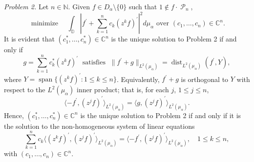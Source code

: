 \documentclass[11 pt,reqno]{amsart}
\theoremstyle{definition}
\theoremstyle{remark}
\numberwithin{equation}{section} \numberwithin{figure}{section}
\newcommand{\CC}{{\mathbb C}}
\newcommand{\DD}{{\mathbb D}}
\newcommand{\NN}{{\mathbb N}}
\DeclareMathOperator{\Pol}{{\mathcal P}}
\DeclareMathOperator{\dist}{dist}
\DeclareMathOperator{\Span}{span}
\begin{document}
\emph{Problem 2.}  Let $n\in\NN$.  Given $f\in D_{\alpha}\setminus\{0\}$ such that
$1\notin f\cdot\Pol_{n}$,
\[  \text{ minimize }\quad
        \int_{\DD}\left|f^{\prime}+\sum_{k=1}^{n}c_{k}(z^{k}f)^{\prime}\right|^{2}
        d\mu_{\alpha}\text{ over }(c_1,\ldots,c_{n})\in\CC^{n}. \]
It is evident that $(c_1^{*},\ldots,c_n^{*})\in\CC^{n}$ is the unique solution to
Problem 2 if and only if
\[  g=\sum_{k=1}^{n}c_{k}^{*}(z^{k}f)^{\prime}\;\text{ satisfies }\;
        \|f^{\prime}+g\|_{L^{2}(\mu_{\alpha})}=\dist_{L^{2}(\mu_{\alpha})}(f^{\prime},Y),   \]
where $Y=\Span\{(z^{k} f)^{\prime}: 1\leq k\leq n\}$. Equivalently, $f^{\prime}+g$ is
orthogonal to $Y$ with respect to the $L^{2}(\mu_{\alpha})$ inner product; that is,
for each $j$, $1\leq j\leq n$,
\[  \langle -f^{\prime}, (z^{j} f)^{\prime}\rangle_{L^{2}(\mu_{\alpha})}
        =\langle g, (z^{j} f)^{\prime}\rangle_{L^{2}(\mu_{\alpha})}.    \]
Hence, $(c_1^{*},\ldots,c_n^{*})\in\CC^{n}$ is the unique solution to Problem 2 if and
only if it is the solution to the non-homogeneous system of linear equations
\begin{equation}\label{keySystem}
            \sum_{k=1}^{n}c_{k}
            \langle (z^{k} f)^{\prime},(z^{j}f)^{\prime}\rangle_{L^{2}(\mu_{\alpha})}
            =\langle -f^{\prime}, (z^{j} f)^{\prime}\rangle_{L^{2}(\mu_{\alpha})},\quad 1\leq k\leq n,
\end{equation}
with $(c_1,\ldots,c_{n})\in\CC^{n}$.
\end{document}
